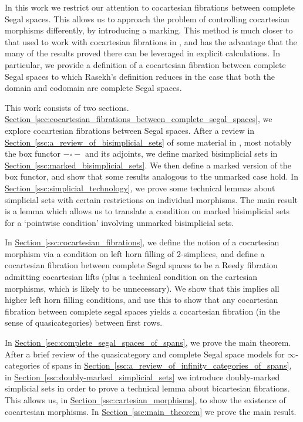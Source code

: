 \documentclass[main.tex]{subfiles}
\begin{document}
In this work we restrict our attention to cocartesian fibrations between complete Segal spaces. This allows us to approach the problem of controlling cocartesian morphisms differently, by introducing a marking. This method is much closer to that used to work with cocartesian fibrations in \cite{highertopostheory}, and has the advantage that the many of the results proved there can be leveraged in explicit calculations. In particular, we provide a definition of a cocartesian fibration between complete Segal spaces to which Rasekh's definition reduces in the case that both the domain and codomain are complete Segal spaces.

This work consists of two sections. \hyperref[sec:cocartesian_fibrations_between_complete_segal_spaces]{Section~\ref*{sec:cocartesian_fibrations_between_complete_segal_spaces}}, we explore cocartesian fibrations between Segal spaces. After a review in \hyperref[ssc:a_review_of_bisimplicial_sets]{Section~\ref*{ssc:a_review_of_bisimplicial_sets}} of some material in \cite{qcats_vs_segal_spaces}, most notably the box functor $- \square -$ and its adjoints, we define marked bisimplicial sets in \hyperref[ssc:marked_bisimplicial_sets]{Section~\ref*{ssc:marked_bisimplicial_sets}}. We then define a marked version of the box functor, and show that some results analogous to the unmarked case hold. In \hyperref[ssc:simplicial_technology]{Section~\ref*{ssc:simplicial_technology}}, we prove some technical lemmas about simplicial sets with certain restrictions on individual morphisms. The main result is a lemma which allows us to translate a condition on marked bisimplicial sets for a `pointwise condition' involving unmarked bisimplicial sets.

In \hyperref[ssc:cocartesian_fibrations]{Section~\ref*{ssc:cocartesian_fibrations}}, we define the notion of a cocartesian morphism via a condition on left horn filling of $2$-simplices, and define a cocartesian fibration between complete Segal spaces to be a Reedy fibration admitting cocartesian lifts (plus a technical condition on the cartesian morphisms, which is likely to be unnecessary). We show that this implies all higher left horn filling conditions, and use this to show that any cocartesian fibration between complete segal spaces yields a cocartesian fibration (in the sense of quasicategories) between first rows.

In \hyperref[sec:complete_segal_spaces_of_spans]{Section~\ref*{sec:complete_segal_spaces_of_spans}}, we prove the main theorem. After a brief review of the quasicategory and complete Segal space models for $\infty$-categories of spans in \hyperref[ssc:a_review_of_infinity_categories_of_spans]{Section~\ref*{ssc:a_review_of_infinity_categories_of_spans}}, in \hyperref[ssc:doubly-marked_simplicial_sets]{Section~\ref*{ssc:doubly-marked_simplicial_sets}} we introduce doubly-marked simplicial sets in order to prove a technical lemma about bicartesian fibrations. This allows us, in \hyperref[ssc:cartesian_morphisms]{Section~\ref*{ssc:cartesian_morphisms}}, to show the existence of cocartesian morphisms. In \hyperref[ssc:main_theorem]{Section~\ref*{ssc:main_theorem}} we prove the main result.
\end{document}
